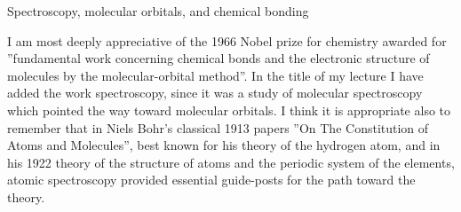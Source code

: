 \documentclass[11pt]{memoir}
\begin{document}
\setlength{\aboverulesep}{0pt} %
\setlength{\belowrulesep}{0pt}
  
\titleformat{\section}{\normalfont\Large\scshape\centering}{\thesection}{}{}
\titleformat{\subsection}{\normalfont\bfseries}{\thesubsection}{}{}



\frontmatter

\mainmatter
{}



\thispagestyle{plain}

\begin{center}
	{\LARGE Spectroscopy, molecular orbitals, and chemical bonding}
\end{center}




I am most deeply appreciative of the 1966 Nobel prize for chemistry awarded for ''fundamental work concerning chemical bonds and the electronic structure of mol\-e\-cules by the molecular-orbital method''.  In the title of my lecture I have added the work spectroscopy, since it was a study of molecular spectroscopy which pointed the way toward molecular orbitals.  I think it is appropriate also to remember that in Niels Bohr's classical 1913 papers ''On The Constitution of Atoms and Molecules'', best known for his theory of the hydrogen atom, and in his 1922 theory of the structure of atoms and the periodic system of the elements, atomic spectroscopy provided essential guide-posts for the path toward the theory.
\end{document}
